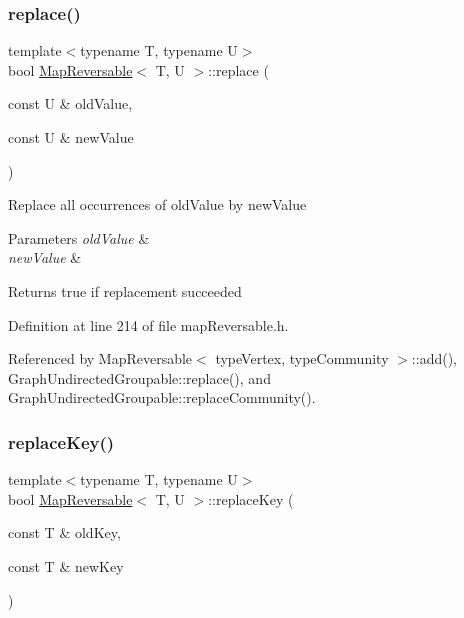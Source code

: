 \subsubsection{\texorpdfstring{replace()}{replace()}}
{\footnotesize\ttfamily template$<$typename T, typename U$>$ \\
bool \hyperlink{classMapReversable}{Map\+Reversable}$<$ T, U $>$\+::replace (\begin{DoxyParamCaption}\item[{const U \&}]{old\+Value,  }\item[{const U \&}]{new\+Value }\end{DoxyParamCaption})\hspace{0.3cm}{\ttfamily [inline]}}

Replace all occurrences of old\+Value by new\+Value 
\begin{DoxyParams}{Parameters}
{\em old\+Value} & \\
\hline
{\em new\+Value} & \\
\hline
\end{DoxyParams}
\begin{DoxyReturn}{Returns}
true if replacement succeeded 
\end{DoxyReturn}


Definition at line 214 of file map\+Reversable.\+h.



Referenced by Map\+Reversable$<$ type\+Vertex, type\+Community $>$\+::add(), Graph\+Undirected\+Groupable\+::replace(), and Graph\+Undirected\+Groupable\+::replace\+Community().

\mbox{\label{classMapReversable_a9dd692e3862043c5cc02cfb9e003cf19}} 
\subsubsection{\texorpdfstring{replace\+Key()}{replaceKey()}}
{\footnotesize\ttfamily template$<$typename T, typename U$>$ \\
bool \hyperlink{classMapReversable}{Map\+Reversable}$<$ T, U $>$\+::replace\+Key (\begin{DoxyParamCaption}\item[{const T \&}]{old\+Key,  }\item[{const T \&}]{new\+Key }\end{DoxyParamCaption})\hspace{0.3cm}{\ttfamily [inline]}}

